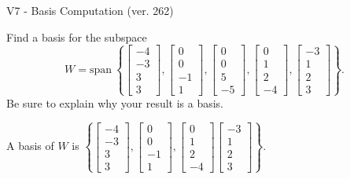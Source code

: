 \begin{exercise}
  \begin{exerciseTitle}V7 - Basis Computation (ver. 262)\end{exerciseTitle}
  \begin{exerciseStatement}
    Find a basis for the subspace 
\[W=\mathrm{span}\ \left\{\left[\begin{array}{r}
-4 \\
-3 \\
3 \\
3
\end{array}\right] , \left[\begin{array}{r}
0 \\
0 \\
-1 \\
1
\end{array}\right] , \left[\begin{array}{r}
0 \\
0 \\
5 \\
-5
\end{array}\right] , \left[\begin{array}{r}
0 \\
1 \\
2 \\
-4
\end{array}\right] , \left[\begin{array}{r}
-3 \\
1 \\
2 \\
3
\end{array}\right]\right\}.\]
 Be sure to explain why your result is a basis.


  \end{exerciseStatement}
  \begin{exerciseAnswer}
   A basis of \(W\) is  \(\left\{\left[\begin{array}{r}
-4 \\
-3 \\
3 \\
3
\end{array}\right] , \left[\begin{array}{r}
0 \\
0 \\
-1 \\
1
\end{array}\right] , \left[\begin{array}{r}
0 \\
1 \\
2 \\
-4
\end{array}\right] \left[\begin{array}{r}
-3 \\
1 \\
2 \\
3
\end{array}\right]\right\}\).
  


  \end{exerciseAnswer}
\end{exercise}